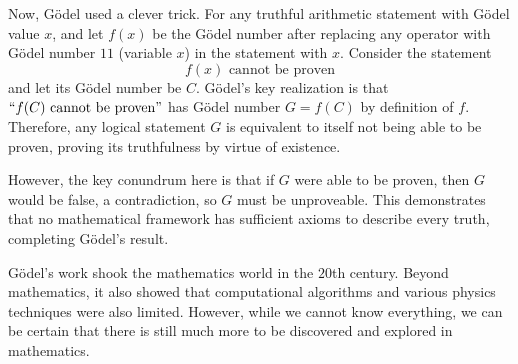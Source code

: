 \documentclass{article}
\begin{document}
Now, Gödel used a clever trick. For any truthful arithmetic statement with Gödel value $x$, and let $f(x)$ be the Gödel number after replacing any operator with Gödel number $11$ (variable $x$) in the statement with $x$. Consider the statement \[f(x) \text{ cannot be proven} \] and let its Gödel number be $C$. Gödel's key realization is that $``f(C) \text{ cannot be proven}"$ has Gödel number $G=f(C)$ by definition of $f$. Therefore, any logical statement $G$ is equivalent to itself not being able to be proven, proving its truthfulness by virtue of existence. 

However, the key conundrum here is that if $G$ were able to be proven, then $G$ would be false, a contradiction, so $G$ must be unproveable. This demonstrates that no mathematical framework has sufficient axioms to describe every truth, completing Gödel's result. 

Gödel's work shook the mathematics world in the $20$th century. Beyond mathematics, it also showed that computational algorithms and various physics techniques were also limited. However, while we cannot know everything, we can be certain that there is still much more to be discovered and explored in mathematics.
\end{document}
